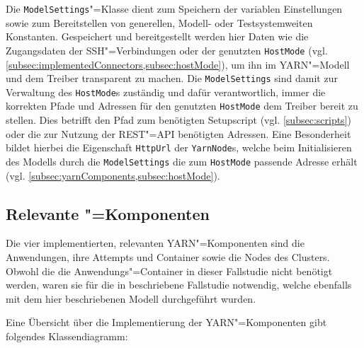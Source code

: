 Die \texttt{ModelSettings}"=Klasse dient zum Speichern der variablen Einstellungen sowie zum Bereitstellen von generellen, Modell- oder Testsystemweiten Konstanten.
Gespeichert und bereitgestellt werden hier Daten wie \zB die Zugangsdaten der SSH"=Verbindungen oder der genutzten \texttt{HostMode} (vgl.  \cref{subsec:implementedConnectors,subsec:hostMode}), um ihn im \gls{YARN}"=Modell und dem Treiber transparent zu machen.
Die \texttt{ModelSettings} sind damit zur Verwaltung des \texttt{HostMode}s zuständig und dafür verantwortlich, immer die korrekten Pfade und Adressen für den genutzten \texttt{HostMode} dem Treiber bereit zu stellen.
Dies betrifft \zB den Pfad zum benötigten Setupscript (vgl. \cref{subsec:scripts}) oder die zur Nutzung der \gls{REST}"=API benötigten Adressen.
Eine Besonderheit bildet hierbei die Eigenschaft \texttt{HttpUrl} der \texttt{YarnNode}s, welche beim Initialisieren des Modells durch die \texttt{ModelSettings} die zum \texttt{HostMode} passende Adresse erhält (vgl. \cref{subsec:yarnComponents,subsec:hostMode}).

\subsection{Relevante "=Komponenten}
\label{subsec:yarnComponents}

Die vier implementierten, relevanten \gls{YARN}"=Komponenten sind die Anwendungen, ihre \glspl{Attempt} und \gls{Container} sowie die Nodes des Clusters.
Obwohl die die Anwendungs"=Container in dieser Fallstudie nicht benötigt werden, waren sie für die in \cite{Eberhardinger2018} beschriebene Fallstudie notwendig, welche ebenfalls mit dem hier beschriebenen Modell durchgeführt wurden.

Eine Übersicht über die Implementierung der \gls{YARN}"=Komponenten gibt folgendes Klassendiagramm:

